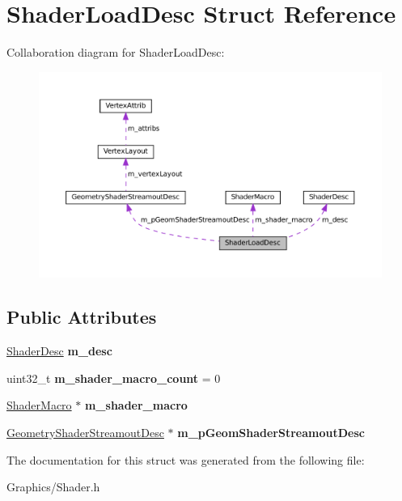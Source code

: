 \hypertarget{structShaderLoadDesc}{}\section{Shader\+Load\+Desc Struct Reference}
\label{structShaderLoadDesc}


Collaboration diagram for Shader\+Load\+Desc\+:\nopagebreak
\begin{figure}[H]
\begin{center}
\leavevmode
\includegraphics[width=350pt]{structShaderLoadDesc__coll__graph}
\end{center}
\end{figure}
\subsection*{Public Attributes}
\begin{DoxyCompactItemize}
\item 
\mbox{\label{structShaderLoadDesc_a0bb594a5f465dd4f8fa3f22f6b96642a}} 
\hyperlink{structShaderDesc}{Shader\+Desc} {\bfseries m\+\_\+desc}
\item 
\mbox{\label{structShaderLoadDesc_adba8efc2daf9054764b30e4ec1d427c4}} 
uint32\+\_\+t {\bfseries m\+\_\+shader\+\_\+macro\+\_\+count} = 0
\item 
\mbox{\label{structShaderLoadDesc_a31cc7278348cbfa75e1c679ff4db6616}} 
\hyperlink{structShaderMacro}{Shader\+Macro} $\ast$ {\bfseries m\+\_\+shader\+\_\+macro}
\item 
\mbox{\label{structShaderLoadDesc_af3dd1fbba5f6368cac4fcf4c581586d0}} 
\hyperlink{structGeometryShaderStreamoutDesc}{Geometry\+Shader\+Streamout\+Desc} $\ast$ {\bfseries m\+\_\+p\+Geom\+Shader\+Streamout\+Desc}
\end{DoxyCompactItemize}


The documentation for this struct was generated from the following file\+:\begin{DoxyCompactItemize}
\item 
Graphics/Shader.\+h\end{DoxyCompactItemize}
